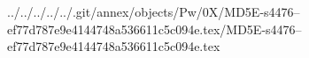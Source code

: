 ../../../../../.git/annex/objects/Pw/0X/MD5E-s4476--ef77d787e9e4144748a536611c5c094e.tex/MD5E-s4476--ef77d787e9e4144748a536611c5c094e.tex